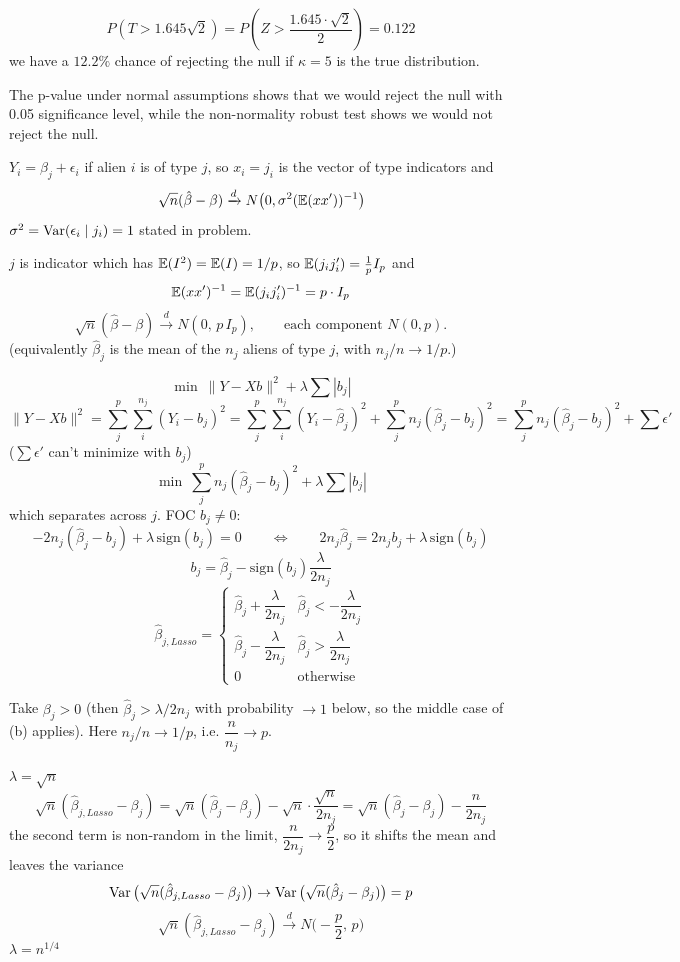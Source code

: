 \documentclass[11pt]{article}
\begin{document}
\[
P(T>1.645\sqrt2)=P\!\left(Z>\frac{1.645\cdot\sqrt2}{2}\right)=0.122
\]
we have a $12.2\%$ chance of rejecting the null if $\kappa=5$ is the true distribution.

The p-value under normal assumptions shows that we would reject the null with 0.05 significance level, while the non-normality robust test shows we would not reject the null.


$Y_i=\beta_j+\epsilon_i$ if alien $i$ is of type $j$, so $x_i=j_i$ is the vector of type indicators and
\[
\sqrt n(\hat\beta-\beta)\xrightarrow{d}N\big(0,\sigma^2(\mathbb{E}(xx'))^{-1}\big)
\]
$\sigma^2=\operatorname{Var}(\epsilon_i\mid j_i)=1$ stated in problem.

$j$ is indicator which has $\mathbb{E}(I^2)=\mathbb{E}(I)=1/p$, so $\mathbb{E}(j_ij_i')=\frac1pI_p$ and
\[
\mathbb{E}(xx')^{-1}=\mathbb{E}(j_ij_i')^{-1}=p\cdot I_p
\]
\[
\sqrt n(\hat\beta-\beta)\xrightarrow{d}N(0,\,p\,I_p),\qquad\text{each component }N(0,p).
\]
(equivalently $\hat\beta_j$ is the mean of the $n_j$ aliens of type $j$, with $n_j/n\to1/p$.)

\[
\min\ \|Y-Xb\|^2+\lambda\sum|b_j|
\]
\[
\|Y-Xb\|^2=\sum_j^{p}\sum_i^{n_j}(Y_i-b_j)^2=\sum_j^{p}\sum_i^{n_j}(Y_i-\hat\beta_j)^2+\sum_j^{p}n_j(\hat\beta_j-b_j)^2
=\sum_j^{p}n_j(\hat\beta_j-b_j)^2+\sum\epsilon'
\]
($\sum\epsilon'$ can't minimize with $b_j$)
\[
\min\ \sum_j^{p}n_j(\hat\beta_j-b_j)^2+\lambda\sum|b_j|
\]
which separates across $j$. FOC $b_j\neq0$:
\[
-2n_j(\hat\beta_j-b_j)+\lambda\,\mathrm{sign}(b_j)=0\qquad\Longleftrightarrow\qquad 2n_j\hat\beta_j=2n_jb_j+\lambda\,\mathrm{sign}(b_j)
\]
\[
b_j=\hat\beta_j-\mathrm{sign}(b_j)\frac{\lambda}{2n_j}
\]
\[
\hat\beta_{j,Lasso}=\begin{cases}
\hat\beta_j+\dfrac{\lambda}{2n_j} & \hat\beta_j<-\dfrac{\lambda}{2n_j}\\[3mm]
\hat\beta_j-\dfrac{\lambda}{2n_j} & \hat\beta_j>\dfrac{\lambda}{2n_j}\\[3mm]
0 & \text{otherwise}
\end{cases}
\]

Take $\beta_j>0$ (then $\hat\beta_j>\lambda/2n_j$ with probability $\to1$ below, so the middle case of (b) applies). Here $n_j/n\to1/p$, i.e. $\dfrac n{n_j}\to p$.

$\lambda=\sqrt n$
\[
\sqrt n(\hat\beta_{j,Lasso}-\beta_j)=\sqrt n(\hat\beta_j-\beta_j)-\sqrt n\cdot\frac{\sqrt n}{2n_j}=\sqrt n(\hat\beta_j-\beta_j)-\frac{n}{2n_j}
\]
the second term is non-random in the limit, $\dfrac n{2n_j}\to\dfrac p2$, so it shifts the mean and leaves the variance
\[
\operatorname{Var}\big(\sqrt n(\hat\beta_{j,Lasso}-\beta_j)\big)\to\operatorname{Var}\big(\sqrt n(\hat\beta_j-\beta_j)\big)=p
\]
\[
\sqrt n(\hat\beta_{j,Lasso}-\beta_j)\xrightarrow{d}N\Big(-\frac p2,\,p\Big)
\]
$\lambda=n^{1/4}$
\end{document}
